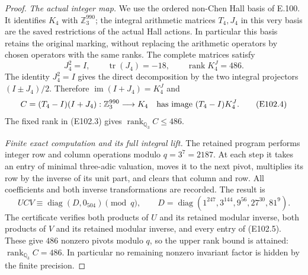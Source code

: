 \begin{proof}
\emph{The actual integer map.}
We use the ordered non-Chen Hall basis of E.100.
It identifies $K_4$ with $\mathbb Z_3^{990}$; the
integral arithmetic matrices $T_4,J_4$ in this very basis
are the saved restrictions of the actual Hall actions.
In particular this basis retains the original marking,
without replacing the arithmetic operators by chosen
operators with the same ranks. The complete matrices
satisfy
\[
 J_4^2=I,\qquad \operatorname{tr}(J_4)=-18,
 \qquad\operatorname{rank}K_4^J=486.
 \tag{E102.3}
\]
The identity $J_4^2=I$ gives the direct decomposition
by the two integral projectors $(I\pm J_4)/2$.
Therefore $\operatorname{im}(I+J_4)=K_4^J$ and
\[
 C=(T_4-I)(I+J_4):\mathbb Z_3^{990}\longrightarrow K_4
 \quad\hbox{has image }(T_4-I)K_4^J.
 \tag{E102.4}
\]
The fixed rank in (E102.3) gives
$\operatorname{rank}_{\mathbb Q_3}C\le486$.

\emph{Finite exact computation and its full integral lift.}
The retained program performs integer row and column
operations modulo $q=3^7=2187$. At each step it takes
an entry of minimal three-adic valuation, moves it to
the next pivot, multiplies its row by the inverse of
its unit part, and clears that column and row.
All coefficients and both inverse transformations
are recorded. The result is
\[
 UCV\equiv\operatorname{diag}(D,0_{504})\pmod q,
 \qquad
 D=\operatorname{diag}
       (1^{247},3^{144},9^{56},27^{30},81^9).
 \tag{E102.5}
\]
The certificate verifies both products of $U$ and its
retained modular inverse, both products of $V$ and its
retained modular inverse, and every entry of (E102.5).
These give $486$ nonzero pivots modulo $q$, so the
upper rank bound is attained:
$\operatorname{rank}_{\mathbb Q_3}C=486$.
In particular no remaining nonzero invariant factor
is hidden by the finite precision.


\end{proof}
